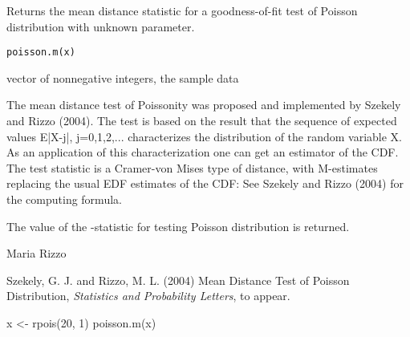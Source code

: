 \documentclass{article}
\begin{document}
\begin{Description}\relax
Returns the mean distance statistic for a goodness-of-fit test of Poisson distribution with unknown parameter.
\end{Description}
\begin{Usage}
\begin{verbatim}
poisson.m(x)
\end{verbatim}
\end{Usage}
\begin{Arguments}
\begin{ldescription}
\item[\code{x}] vector of nonnegative integers, the sample data 
\end{ldescription}
\end{Arguments}
\begin{Details}\relax
The mean distance test of Poissonity was proposed and implemented by Szekely and Rizzo (2004). The test is based on the result that the sequence of expected values E|X-j|, j=0,1,2,... characterizes the distribution of the random variable X. As an application of this characterization one can get an estimator  of the CDF. The test statistic is a Cramer-von Mises type of distance, with M-estimates replacing the usual EDF estimates of the CDF: 
 See Szekely and Rizzo (2004) for the computing formula.
\end{Details}
\begin{Value}
The value of the -statistic for testing Poisson distribution is returned.\end{Value}
\begin{Author}\relax
Maria Rizzo 
\end{Author}
\begin{References}\relax
Szekely, G. J. and Rizzo, M. L. (2004) Mean Distance Test
of Poisson Distribution, \emph{Statistics and Probability Letters}, to appear.
\end{References}
\begin{SeeAlso}\relax
{}
\end{SeeAlso}
\begin{Examples}
\begin{ExampleCode}
 x <- rpois(20, 1)
poisson.m(x)
 \end{ExampleCode}
\end{Examples}
\end{document}
